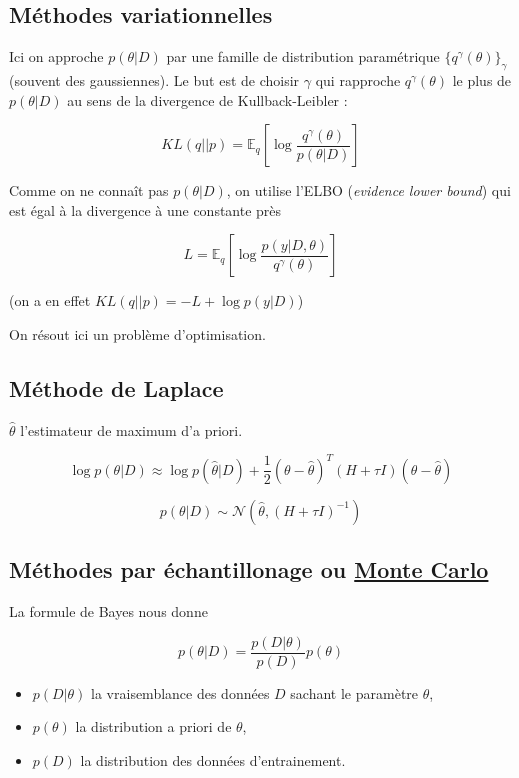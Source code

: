 \documentclass[french,12pt]{article}
\begin{document}
\subsection{Méthodes variationnelles}

Ici on approche $p(\theta | D)$ par une famille de distribution
paramétrique $\{q^{\gamma}(\theta)\}_{\gamma}$ (souvent des gaussiennes).
Le but est de choisir $\gamma$ qui rapproche $q^{\gamma}(\theta)$
le plus de $p(\theta | D)$ au sens de la divergence de Kullback-Leibler :

$$KL(q||p) = \mathbb{E}_q \left[\log \frac{q^{\gamma}(\theta)}{p(\theta | D)}\right]$$

Comme on ne connaît pas $p(\theta | D)$, on utilise l'ELBO (\textit{evidence lower bound})
qui est égal à la divergence à une constante près

$$L =\mathbb{E}_q \left[\log \frac{p(y | D, \theta)}{q^{\gamma}(\theta)}\right]$$

(on a en effet $KL(q||p) = -L +  \log p(y| D)$)

On résout ici un problème d'optimisation.

\subsection{Méthode de Laplace}

$\hat{\theta}$ l'estimateur de maximum d'a priori.

$$\log p(\theta | D) \approx \log p(\hat{\theta} | D)
    + \frac{1}{2} (\theta - \hat{\theta})^T (H + \tau I)
    (\theta - \hat{\theta})$$

$$p(\theta | D) \sim \mathcal{N}(\hat{\theta}, (H + \tau I)^{-1})$$

\subsection{Méthodes par échantillonage ou \href{https://en.wikipedia.org/wiki/Monte_Carlo_method}{Monte Carlo}}

La formule de Bayes nous donne

$$p(\theta | D) = \frac{p(D | \theta) }{p(D)}p(\theta)$$

\begin{itemize}
    \item $p(D | \theta)$ la vraisemblance des données $D$ sachant le paramètre $\theta$,
    \item $p(\theta)$ la distribution a priori de $\theta$,
    \item $p(D)$ la distribution des données d'entrainement.
\end{itemize}
\end{document}
